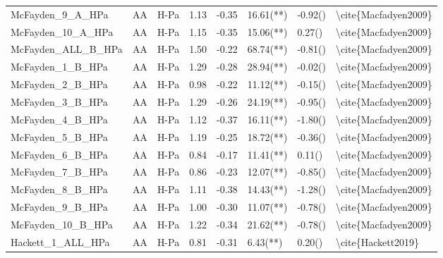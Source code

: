 \begin{tabular}{lllrrlll}
McFayden\_9\_A\_HPa   &   AA &  H-Pa &              1.13 & -0.35 &                16.61(**) &    -0.92() &  \textbackslash cite\{Macfadyen2009\} \\
McFayden\_10\_A\_HPa  &   AA &  H-Pa &              1.15 & -0.35 &                15.06(**) &     0.27() &  \textbackslash cite\{Macfadyen2009\} \\
McFayden\_ALL\_B\_HPa &   AA &  H-Pa &              1.50 & -0.22 &                68.74(**) &    -0.81() &  \textbackslash cite\{Macfadyen2009\} \\
McFayden\_1\_B\_HPa   &   AA &  H-Pa &              1.29 & -0.28 &                28.94(**) &    -0.02() &  \textbackslash cite\{Macfadyen2009\} \\
McFayden\_2\_B\_HPa   &   AA &  H-Pa &              0.98 & -0.22 &                11.12(**) &    -0.15() &  \textbackslash cite\{Macfadyen2009\} \\
McFayden\_3\_B\_HPa   &   AA &  H-Pa &              1.29 & -0.26 &                24.19(**) &    -0.95() &  \textbackslash cite\{Macfadyen2009\} \\
McFayden\_4\_B\_HPa   &   AA &  H-Pa &              1.12 & -0.37 &                16.11(**) &    -1.80() &  \textbackslash cite\{Macfadyen2009\} \\
McFayden\_5\_B\_HPa   &   AA &  H-Pa &              1.19 & -0.25 &                18.72(**) &    -0.36() &  \textbackslash cite\{Macfadyen2009\} \\
McFayden\_6\_B\_HPa   &   AA &  H-Pa &              0.84 & -0.17 &                11.41(**) &     0.11() &  \textbackslash cite\{Macfadyen2009\} \\
McFayden\_7\_B\_HPa   &   AA &  H-Pa &              0.86 & -0.23 &                12.07(**) &    -0.85() &  \textbackslash cite\{Macfadyen2009\} \\
McFayden\_8\_B\_HPa   &   AA &  H-Pa &              1.11 & -0.38 &                14.43(**) &    -1.28() &  \textbackslash cite\{Macfadyen2009\} \\
McFayden\_9\_B\_HPa   &   AA &  H-Pa &              1.00 & -0.30 &                11.07(**) &    -0.78() &  \textbackslash cite\{Macfadyen2009\} \\
McFayden\_10\_B\_HPa  &   AA &  H-Pa &              1.22 & -0.34 &                21.62(**) &    -0.78() &  \textbackslash cite\{Macfadyen2009\} \\
Hackett\_1\_ALL\_HPa  &   AA &  H-Pa &              0.81 & -0.31 &                 6.43(**) &     0.20() &    \textbackslash cite\{Hackett2019\} \\

\end{tabular}
